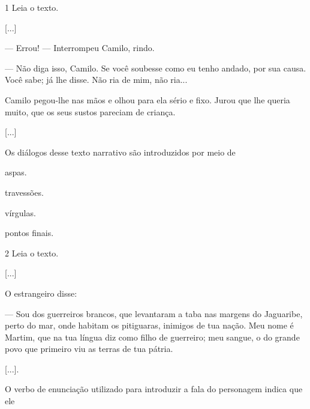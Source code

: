 \num{1} Leia o texto.

\begin{myquote}
{[}...{]}

— Errou! — Interrompeu Camilo, rindo.

— Não diga isso, Camilo. Se você soubesse como eu tenho andado, por
sua causa. Você sabe; já lhe disse. Não ria de mim, não ria...

Camilo pegou-lhe nas mãos e olhou para ela sério e fixo. Jurou que lhe
queria muito, que os seus sustos pareciam de criança.

{[}...{]}

\end{myquote}

Os diálogos desse texto narrativo são introduzidos por meio de

\begin{multicols}{2}
\begin{escolha}
\item aspas.

\item travessões.

\item vírgulas.

\item pontos finais.
\end{escolha}
\end{multicols}


\num{2} Leia o texto.

\begin{myquote}
{[}...{]}

O estrangeiro disse:

— Sou dos guerreiros brancos, que levantaram a taba nas margens do
Jaguaribe, perto do mar, onde habitam os pitiguaras, inimigos de tua
nação. Meu nome é Martim, que na tua língua diz como filho de guerreiro;
meu sangue, o do grande povo que primeiro viu as terras de tua pátria.

{[}...{]}.

\end{myquote}

O verbo de enunciação utilizado para introduzir a fala do personagem indica que ele

